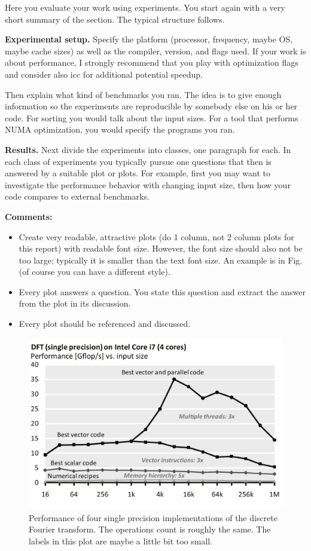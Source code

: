 \documentclass[conference]{IEEEtran}
\newcommand{\mypar}[1]{{\bf #1.}}
\begin{document}
Here you evaluate your work using experiments. You start again with a very
short summary of the section. The typical structure follows.

\mypar{Experimental setup} Specify the platform (processor, frequency, maybe OS, maybe cache sizes)
as well as the compiler, version, and flags used. If your work is about performance,
I strongly recommend that you play with optimization flags and consider also icc for additional potential speedup.

Then explain what kind of benchmarks you ran. The idea is to give enough
information so the experiments are reproducible by somebody else on his or her
code. For sorting you would talk about the input sizes. For a tool that
performs NUMA optimization, you would specify the programs you ran.

\mypar{Results}
Next divide the experiments into classes, one paragraph for each. In each class of experiments you typically pursue one questions that then is answered by a suitable plot or plots. For example, first you may want to investigate the performance behavior with changing input size, then how your code compares to external benchmarks.

  {\bf Comments:}
\begin{itemize}
  \item Create very readable, attractive plots (do 1 column, not 2 column plots for
        this report) with readable font size. However, the font size should also not be
        too large; typically it is smaller than the text font size. An example is in
        Fig. (of course you can have a different style).
  \item Every plot answers a question. You state this question and extract the answer
        from the plot in its discussion.
  \item Every plot should be referenced and discussed.
\end{itemize}

\begin{figure}\centering
  \includegraphics[scale=0.33]{example-plot}
  \caption{Performance of four single precision implementations of the
    discrete Fourier transform. The operations count is roughly the
    same. The labels in this plot are maybe a little bit too small.\label{fftperf}}
\end{figure}
\end{document}
